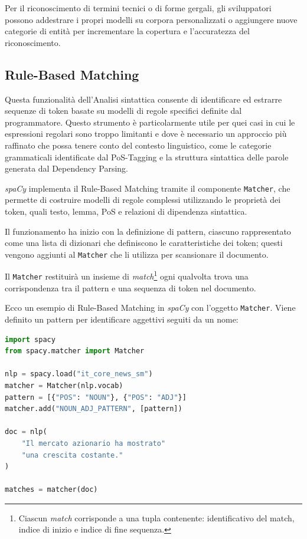 \documentclass[12pt]{report}
\newcommand{\spacy}{\textsl{spaCy}\xspace}
\begin{document}
Per il riconoscimento di termini tecnici o di forme gergali, gli sviluppatori possono addestrare i propri modelli su corpora personalizzati o aggiungere nuove categorie di entità per incrementare la copertura e l’accuratezza del riconoscimento.


\subsection{Rule-Based Matching}
Questa funzionalità dell'\textsf{Analisi sintattica} consente di identificare ed estrarre sequenze di token basate su modelli di regole specifici definite dal programmatore. Questo strumento è particolarmente utile per quei casi in cui le espressioni regolari sono troppo limitanti e dove è necessario un approccio più raffinato che possa tenere conto del contesto linguistico, come le categorie grammaticali identificate dal PoS-Tagging e la struttura sintattica delle parole generata dal Dependency Parsing.

\spacy implementa il Rule-Based Matching tramite il componente \texttt{Matcher}, che permette di costruire modelli di regole complessi utilizzando le proprietà dei token, quali testo, lemma, PoS e relazioni di dipendenza sintattica.

Il funzionamento ha inizio con la definizione di pattern, ciascuno rappresentato come una lista di dizionari che definiscono le caratteristiche dei token; questi vengono aggiunti al \texttt{Matcher} che li utilizza per scansionare il documento.

Il \texttt{Matcher} restituirà un insieme di \textit{match}\footnote{Ciascun \textit{match} corrisponde a una tupla contenente: identificativo del match, indice di inizio e indice di fine sequenza.} ogni qualvolta trova una corrispondenza tra il pattern e una sequenza di token nel documento.

\begin{mdframed}
\small
Ecco un esempio di Rule-Based Matching in \spacy con l'oggetto \texttt{Matcher}. Viene definito un pattern per identificare aggettivi seguiti da un nome:

\begin{lstlisting}[language=Python]
import spacy
from spacy.matcher import Matcher

nlp = spacy.load("it_core_news_sm")
matcher = Matcher(nlp.vocab)
pattern = [{"POS": "NOUN"}, {"POS": "ADJ"}]
matcher.add("NOUN_ADJ_PATTERN", [pattern])

doc = nlp(
    "Il mercato azionario ha mostrato"
    "una crescita costante."
)

matches = matcher(doc)
\end{lstlisting}
\end{mdframed}
\end{document}
